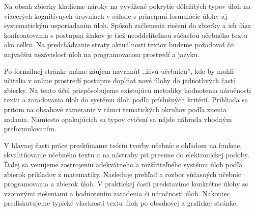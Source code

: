 Na obsah zbierky kladieme nároky na vyvážené pokrytie dôležitých typov úloh na viacerých kognitívnych úrovniach v súlade s princípmi formulácie úlohy aj systematickým usporiadaním úloh. Spôsob začlenenia riešení do zbierky a ich fáza konfrontovania s postupmi žiakov je tiež neoddeliteľnou súčasťou učebného textu ako celku. Na predchádzanie straty aktuálnosti textov budeme požadovať čo najväčšiu nezávislosť úloh na programovacom prostredí a jazyku.

Po formálnej stránke máme záujem navrhnúť ,,živú učebnicu'', kde by mohli učitelia v online prostredí postupne dopĺňať nové úlohy do jednotlivých častí zbierky. Na tento účel prispôsobujeme existujúcu metodiky hodnotenia náročnosti textu a zaraďovania úloh do systému úloh podľa príslušných kritérií. Prihliada sa pritom na obsahové zameranie v rámci tematických okruhov podľa znenia zadania. Namiesto opakujúcich sa typov cvičení sa nájde náhrada vhodným preformulovaním.

V hlavnej časti práce preskúmame teóriu tvorby učebníc s ohľadom na funkcie, skvalitňovanie učebného textu a na nástrahy pri presune do elektronickej podoby. Ďalej sa venujeme zostrojeniu adekvátneho a rozšíriteľného systému úloh podľa zbierok príkladov z matematiky. Nasleduje prehľad a rozbor súčasných učebníc programovania a zbierok úloh. V praktickej časti predstavíme konkrétne úlohy so vzorovými riešeniami a hodnotením zaradenia či náročnosti úloh. Nakoniec prediskutujeme typické vlastnosti textu úloh po obsahovej a grafickej stránke.